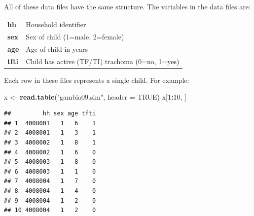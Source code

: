 \documentclass[12pt,a4paper]{book}
\newenvironment{Shaded}{\begin{snugshade}}{\end{snugshade}}
\newcommand{\KeywordTok}[1]{\textcolor[rgb]{0.13,0.29,0.53}{\textbf{#1}}}
\newcommand{\DataTypeTok}[1]{\textcolor[rgb]{0.13,0.29,0.53}{#1}}
\newcommand{\DecValTok}[1]{\textcolor[rgb]{0.00,0.00,0.81}{#1}}
\newcommand{\StringTok}[1]{\textcolor[rgb]{0.31,0.60,0.02}{#1}}
\newcommand{\OtherTok}[1]{\textcolor[rgb]{0.56,0.35,0.01}{#1}}
\newcommand{\OperatorTok}[1]{\textcolor[rgb]{0.81,0.36,0.00}{\textbf{#1}}}
\newcommand{\NormalTok}[1]{#1}
\theoremstyle{definition}
\theoremstyle{definition}
\theoremstyle{definition}
\theoremstyle{remark}
\begin{document}
All of these data files have the same structure. The variables in the
data files are:

\begin{longtable}[]{@{}ll@{}}
\toprule
\begin{minipage}[t]{0.21\columnwidth}\raggedright
\textbf{hh}\strut
\end{minipage} & \begin{minipage}[t]{0.67\columnwidth}\raggedright
Household identifier\strut
\end{minipage}\tabularnewline
\begin{minipage}[t]{0.21\columnwidth}\raggedright
\textbf{sex}\strut
\end{minipage} & \begin{minipage}[t]{0.67\columnwidth}\raggedright
Sex of child (1=male, 2=female)\strut
\end{minipage}\tabularnewline
\begin{minipage}[t]{0.21\columnwidth}\raggedright
\textbf{age}\strut
\end{minipage} & \begin{minipage}[t]{0.67\columnwidth}\raggedright
Age of child in years\strut
\end{minipage}\tabularnewline
\begin{minipage}[t]{0.21\columnwidth}\raggedright
\textbf{tfti}\strut
\end{minipage} & \begin{minipage}[t]{0.67\columnwidth}\raggedright
Child has active (TF/TI) trachoma (0=no, 1=yes)\strut
\end{minipage}\tabularnewline
\bottomrule
\end{longtable}

Each row in these files represents a single child. For example:

\begin{Shaded}
\begin{Highlighting}[]
\NormalTok{x <-}\StringTok{ }\KeywordTok{read.table}\NormalTok{(}\StringTok{"gambia09.sim"}\NormalTok{, }\DataTypeTok{header =} \OtherTok{TRUE}\NormalTok{)}
\NormalTok{x[}\DecValTok{1}\OperatorTok{:}\DecValTok{10}\NormalTok{, ]}
\end{Highlighting}
\end{Shaded}

\begin{verbatim}
##         hh sex age tfti
## 1  4008001   1   6    1
## 2  4008001   1   3    1
## 3  4008002   1   8    1
## 4  4008002   1   6    0
## 5  4008003   1   8    0
## 6  4008003   1   1    0
## 7  4008004   1   7    0
## 8  4008004   1   4    0
## 9  4008004   1   2    0
## 10 4008004   1   2    0
\end{verbatim}
\end{document}
